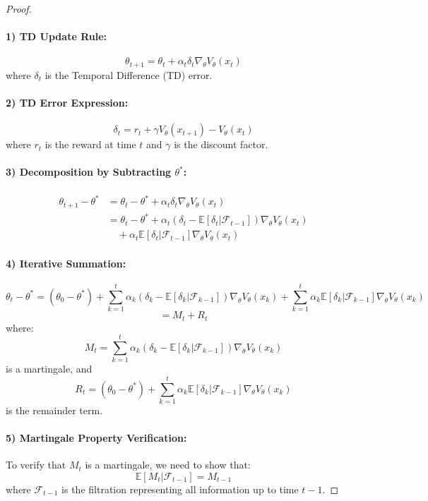 \begin{proof}
\;\newline
\paragraph{1) TD Update Rule:}
\[
\theta_{t+1} = \theta_t + \alpha_t \delta_t \nabla_\theta V_\theta(x_t)
\]
where \( \delta_t \) is the Temporal Difference (TD) error.

\paragraph{2) TD Error Expression:}
\[
\delta_t = r_t + \gamma V_\theta(x_{t+1}) - V_\theta(x_t)
\]
where \( r_t \) is the reward at time \( t \) and \( \gamma \) is the discount factor.

\paragraph{3) Decomposition by Subtracting \( \theta^* \):}
\begin{align*}
\theta_{t+1} - \theta^* &= \theta_t - \theta^* + \alpha_t \delta_t \nabla_\theta V_\theta(x_t) \\
&= \theta_t - \theta^* + \alpha_t (\delta_t - \mathbb{E}[\delta_t|\mathcal{F}_{t-1}])\nabla_\theta V_\theta(x_t) \\
&\quad + \alpha_t \mathbb{E}[\delta_t|\mathcal{F}_{t-1}]\nabla_\theta V_\theta(x_t)
\end{align*}

\paragraph{4) Iterative Summation:}
\[
\theta_t - \theta^* = (\theta_0 - \theta^*) + \sum_{k=1}^t \alpha_k (\delta_k - \mathbb{E}[\delta_k|\mathcal{F}_{k-1}])\nabla_\theta V_\theta(x_k) + \sum_{k=1}^t \alpha_k \mathbb{E}[\delta_k|\mathcal{F}_{k-1}]\nabla_\theta V_\theta(x_k)
\]
\[
= M_t + R_t
\]
where:
\[
M_t = \sum_{k=1}^t \alpha_k (\delta_k - \mathbb{E}[\delta_k|\mathcal{F}_{k-1}])\nabla_\theta V_\theta(x_k)
\]
is a martingale, and
\[
R_t = (\theta_0 - \theta^*) + \sum_{k=1}^t \alpha_k \mathbb{E}[\delta_k|\mathcal{F}_{k-1}]\nabla_\theta V_\theta(x_k)
\]
is the remainder term.

\paragraph{5) Martingale Property Verification:}
To verify that \( M_t \) is a martingale, we need to show that:
\[
\mathbb{E}[M_t | \mathcal{F}_{t-1}] = M_{t-1}
\]
where \( \mathcal{F}_{t-1} \) is the filtration representing all information up to time \( t-1 \).


\end{proof}
